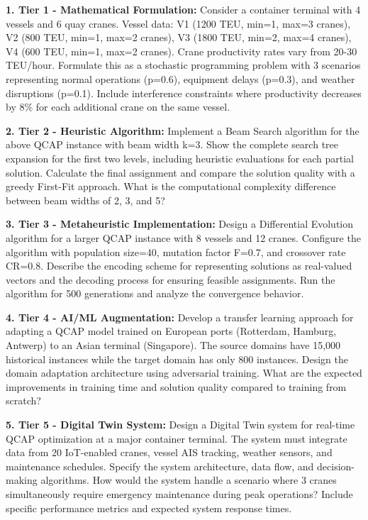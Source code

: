 \documentclass{article}
\begin{document}
\textbf{1. Tier 1 - Mathematical Formulation:}
Consider a container terminal with 4 vessels and 6 quay cranes. Vessel data: V1 (1200 TEU, min=1, max=3 cranes), V2 (800 TEU, min=1, max=2 cranes), V3 (1800 TEU, min=2, max=4 cranes), V4 (600 TEU, min=1, max=2 cranes). Crane productivity rates vary from 20-30 TEU/hour. Formulate this as a stochastic programming problem with 3 scenarios representing normal operations (p=0.6), equipment delays (p=0.3), and weather disruptions (p=0.1). Include interference constraints where productivity decreases by 8\% for each additional crane on the same vessel.

\textbf{2. Tier 2 - Heuristic Algorithm:}
Implement a Beam Search algorithm for the above QCAP instance with beam width k=3. Show the complete search tree expansion for the first two levels, including heuristic evaluations for each partial solution. Calculate the final assignment and compare the solution quality with a greedy First-Fit approach. What is the computational complexity difference between beam widths of 2, 3, and 5?

\textbf{3. Tier 3 - Metaheuristic Implementation:}
Design a Differential Evolution algorithm for a larger QCAP instance with 8 vessels and 12 cranes. Configure the algorithm with population size=40, mutation factor F=0.7, and crossover rate CR=0.8. Describe the encoding scheme for representing solutions as real-valued vectors and the decoding process for ensuring feasible assignments. Run the algorithm for 500 generations and analyze the convergence behavior.

\textbf{4. Tier 4 - AI/ML Augmentation:}
Develop a transfer learning approach for adapting a QCAP model trained on European ports (Rotterdam, Hamburg, Antwerp) to an Asian terminal (Singapore). The source domains have 15,000 historical instances while the target domain has only 800 instances. Design the domain adaptation architecture using adversarial training. What are the expected improvements in training time and solution quality compared to training from scratch?

\textbf{5. Tier 5 - Digital Twin System:}
Design a Digital Twin system for real-time QCAP optimization at a major container terminal. The system must integrate data from 20 IoT-enabled cranes, vessel AIS tracking, weather sensors, and maintenance schedules. Specify the system architecture, data flow, and decision-making algorithms. How would the system handle a scenario where 3 cranes simultaneously require emergency maintenance during peak operations? Include specific performance metrics and expected system response times.
\end{document}
